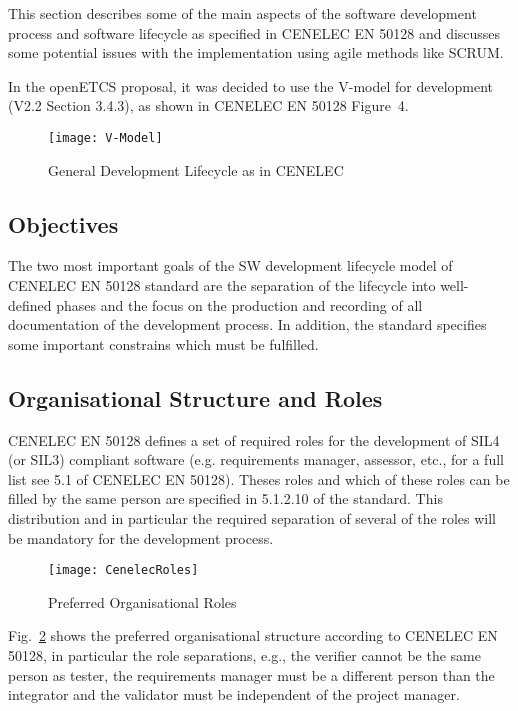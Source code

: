
This section describes some of the main aspects of the software development
process and software lifecycle as specified in CENELEC EN 50128 and discusses
some potential issues with the implementation using agile methods like SCRUM.

In the openETCS proposal, it was decided to use the V-model for development
(V2.2 Section 3.4.3), as shown in CENELEC EN 50128 Figure~4.

\begin{figure}[ht]
  \centering
  \texttt{[image: V-Model]}
  \caption{General Development Lifecycle as in CENELEC}
  \label{fig:develop-lifecycle-cenelec}
\end{figure}

\subsection{Objectives}
\label{sec:objectives}

The two most important goals of the SW development lifecycle model of CENELEC EN
50128 standard are the separation of the lifecycle into well-defined phases and
the focus on the production and recording of all documentation of the
development process. In addition, the standard specifies some important
constrains which must be fulfilled.

\subsection{Organisational Structure and Roles}
\label{sec:organ-struct-roles}

CENELEC EN 50128 defines a set of required roles for the development of SIL4 (or
SIL3) compliant software (e.g. requirements manager, assessor, etc., for a full
list see 5.1 of CENELEC EN 50128). Theses roles and which of these roles can be
filled by the same person are specified in 5.1.2.10 of the standard. This
distribution and in particular the required separation of several of the roles
will be mandatory for the development process.

\begin{figure}[ht]
  \centering
  \texttt{[image: CenelecRoles]}
  \caption{Preferred Organisational Roles}
  \label{fig:preferred-roles}
\end{figure}

Fig.~\ref{fig:preferred-roles} shows the preferred organisational structure
according to CENELEC EN 50128, in particular  the role separations,
e.g., the verifier cannot be the same person as tester, the requirements
manager must be a different person than the integrator and the validator must be
independent of the project manager.

